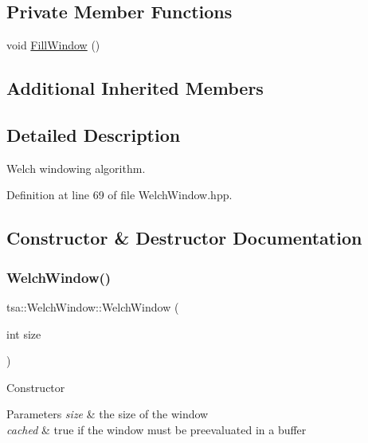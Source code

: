 \subsection*{Private Member Functions}
\begin{DoxyCompactItemize}
\item 
void \hyperlink{classtsa_1_1_welch_window_aa5dd01231aa4a33fb43473209a679309}{Fill\+Window} ()
\end{DoxyCompactItemize}
\subsection*{Additional Inherited Members}


\subsection{Detailed Description}
Welch windowing algorithm. 

Definition at line 69 of file Welch\+Window.\+hpp.



\subsection{Constructor \& Destructor Documentation}
\mbox{\label{classtsa_1_1_welch_window_a81dc23dff14e460bd12c738ac8d92f5e}} 
\subsubsection{\texorpdfstring{Welch\+Window()}{WelchWindow()}\hspace{0.1cm}{\footnotesize\ttfamily [1/2]}}
{\footnotesize\ttfamily tsa\+::\+Welch\+Window\+::\+Welch\+Window (\begin{DoxyParamCaption}\item[{int}]{size }\end{DoxyParamCaption})\hspace{0.3cm}{\ttfamily [inline]}}

Constructor


\begin{DoxyParams}{Parameters}
{\em size} & the size of the window \\
\hline
{\em cached} & true if the window must be preevaluated in a buffer \\
\hline
\end{DoxyParams}


